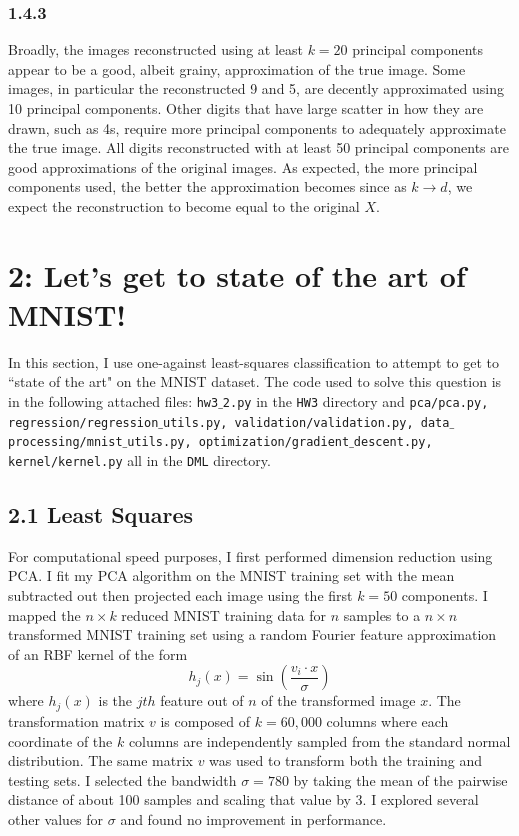 \documentclass[12pt]{amsart}
\begin{document}
\subsubsection*{1.4.3}

Broadly, the images reconstructed using at least $k = 20$ principal components appear to be a good, albeit grainy, approximation of the true image.  Some images, in particular the reconstructed 9 and 5, are decently approximated using 10 principal components.  Other digits that have large scatter in how they are drawn, such as 4s, require more principal components to adequately approximate the true image.  All digits reconstructed with at least 50 principal components are good approximations of the original images.  As expected, the more principal components used, the better the approximation becomes since as $k \rightarrow d$, we expect the reconstruction to become equal to the original $X$.

\section*{2: Let's get to state of the art of MNIST!}

In this section, I use one-against least-squares classification to attempt to get to ``state of the art" on the MNIST dataset.  The code used to solve this question is in the following attached files: {\tt hw3$\_$2.py} in the {\tt HW3} directory and {\tt pca/pca.py, regression/regression$\_$utils.py, validation/validation.py, data$\_$processing/mnist$\_$utils.py, optimization/gradient$\_$descent.py, kernel/kernel.py} all in the {\tt DML} directory.

\subsection*{2.1 Least Squares}

For computational speed purposes, I first performed dimension reduction using PCA.  I fit my PCA algorithm on the MNIST training set with the mean subtracted out then projected each image using the first $k = 50$ components.  I mapped the $n \times k$ reduced MNIST training data for $n$ samples to a $n \times n$ transformed MNIST training set using a random Fourier feature approximation of an RBF kernel of the form
\begin{equation} \label{eqn:rbf_kernel}
h_j(x) = \sin \left( \frac{v_i \cdot x}{\sigma} \right)
\end{equation}
where $h_j(x)$ is the $jth$ feature out of $n$ of the transformed image $x$.  The transformation matrix $v$ is composed of $k = 60,000$ columns where each coordinate of the $k$ columns are independently sampled from the standard normal distribution.  The same matrix $v$ was used to transform both the training and testing sets.  I selected the bandwidth $\sigma = 780$ by taking the mean of the pairwise distance of about 100 samples and scaling that value by 3.  I explored several other values for $\sigma$ and found no improvement in performance.  
\end{document}
